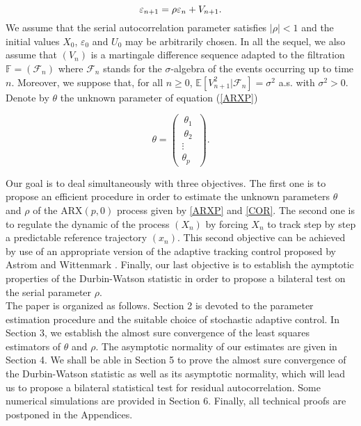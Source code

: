\documentclass[article,12pt]{amsart}
\numberwithin{equation}{section}
\theoremstyle{plain}
\begin{document}
\vspace{2ex}
\begin{equation} 
\label{COR}
\varepsilon_{n+1}=\rho\varepsilon_{n}+V_{n+1}.
\vspace{2ex}
\end{equation}
We assume that the serial autocorrelation parameter satisfies $|\rho|<1$ and the initial values $X_0$, 
$\varepsilon_0$ and $U_0$ may be arbitrarily chosen. In all the sequel, we also assume that $(V_n)$ is a martingale difference
sequence adapted to the filtration $\mathbb{F} = (\mathcal{F}_n)$ where $\mathcal{F}_n$ stands
for the $\sigma$-algebra of the events occurring up to time $n$. Moreover, we suppose that, for all $n \geq 0$, 
$\mathbb{E}\left[V_{n+1}^2|\mathcal{F}_n\right]=\sigma^2$ a.s. with $\sigma^2>0$. 
Denote by $\theta$ the unknown parameter of equation (\ref{ARXP})

$$\theta = \begin{pmatrix}
\ \theta_1 \ \\
\ \theta_2 \ \\
\vdots \\
\theta_p
\end{pmatrix}.
$$

Our goal is to deal simultaneously with three objectives. The first one is to propose an efficient procedure in order to estimate
the unknown parameters $\theta$ and $\rho$ of the $\text{ARX}(p,0)$ process given by \eqref{ARXP} and \eqref{COR}.
The second one is to regulate the dynamic of the process $(X_n)$ by forcing $X_n$ to track step by step a predictable reference trajectory $(x_n)$. 
This second objective can be achieved by use of an appropriate version of the adaptive tracking control
proposed by Astr$\ddot{\mbox{o}}$m and Wittenmark \cite{Astrom}. Finally, our last objective is to establish the aymptotic properties of 
the Durbin-Watson statistic in order 
to propose a bilateral test on the serial parameter $\rho$.
\ \vspace{2ex} \\
The paper is organized as follows. Section 2 is devoted to the parameter estimation procedure and the suitable choice
of stochastic adaptive control. In Section 3, we establish the almost sure convergence of the least squares estimators of $\theta$ and $\rho$. 
The asymptotic normality of our estimates are given in Section 4.
We shall be able in Section 5 to prove the almost sure convergence of the Durbin-Watson statistic
as well as its asymptotic normality, which will lead us to propose a bilateral statistical test for 
residual autocorrelation. Some numerical simulations are provided in
Section 6. Finally, all technical proofs are postponed in the
Appendices.
\end{document}
